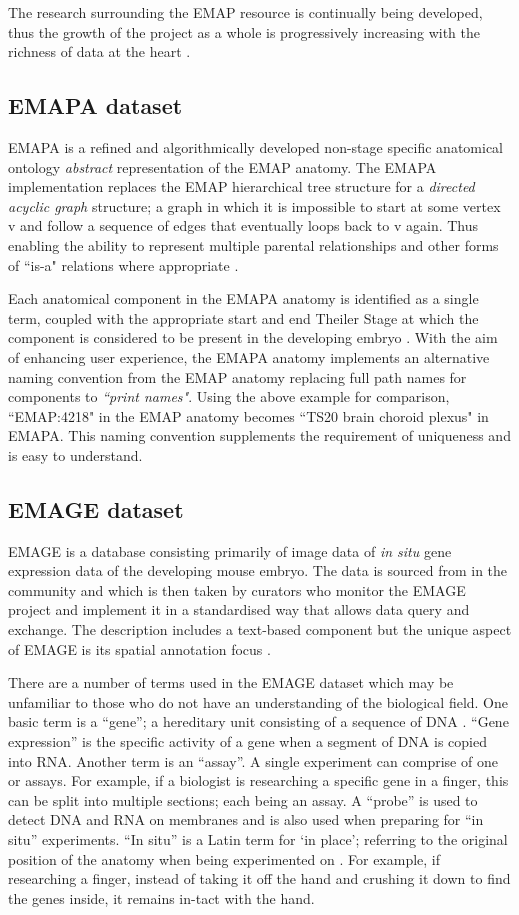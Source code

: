 The research surrounding the EMAP resource is continually being developed, thus the growth of the project as a whole is progressively increasing with the richness of data at the heart \cite{emap}.

\subsection{EMAPA dataset}\label{emapaanatomy}
EMAPA is a refined and algorithmically developed non-stage specific anatomical ontology \textit{abstract} representation of the EMAP anatomy. The EMAPA implementation replaces the EMAP hierarchical tree structure for a \textit{directed acyclic graph} structure; a graph in which it is impossible to start at some vertex v and follow a sequence of edges that eventually loops back to v again. Thus enabling the ability to represent multiple parental relationships and other forms of ``is-a" relations where appropriate \cite{emap}.

Each anatomical component in the EMAPA anatomy is identified as a single term, coupled with the appropriate start and end Theiler Stage at which the component is considered to be present in the developing embryo \cite{emap}. With the aim of enhancing user experience, the EMAPA anatomy  implements an alternative naming convention from the EMAP anatomy replacing full path names for components to \textit{``print names"}. Using the above example for comparison, ``EMAP:4218" in the EMAP anatomy becomes ``TS20 brain choroid plexus" in EMAPA. This naming convention supplements the requirement of uniqueness and is easy to understand.

\subsection{EMAGE dataset}
EMAGE is a database consisting primarily of image data of \textit{in situ} gene expression data of the developing mouse embryo. The data is sourced from in the community and which is then taken by curators who monitor the EMAGE project and implement it in a standardised way that allows data query and exchange. The description includes a text-based component but the unique aspect of EMAGE is its spatial annotation focus \cite{emap}.

There are a number of terms used in the EMAGE dataset which may be unfamiliar to those who do not have an understanding of the biological field. One basic term is a ``gene''; a hereditary unit consisting of a sequence of DNA \cite{emap}. ``Gene expression'' is the specific activity of a gene when a segment of DNA is copied into RNA. Another term is an ``assay''. A single experiment can comprise of one or assays. For example, if a biologist is researching a specific gene in a finger, this can be split into multiple sections; each being an assay. A ``probe'' is used to detect DNA and RNA on membranes and is also used when preparing for ``in situ'' experiments. ``In situ'' is a Latin term for `in place'; referring to the original position of the anatomy when being experimented on \cite{emap}. For example, if researching a finger, instead of taking it off the hand and crushing it down to find the genes inside, it remains in-tact with the hand.

